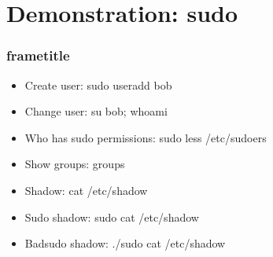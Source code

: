 \section{Demonstration: sudo}

\begin{frame}
  \frametitle{frametitle}
%
\begin{itemize}
  \item Create user:              sudo useradd bob
  \item Change user:              su bob; whoami
  \item Who has sudo permissions: sudo less /etc/sudoers
  \item Show groups:              groups
  \item Shadow:                   cat /etc/shadow
  \item Sudo shadow:              sudo cat /etc/shadow
  \item Badsudo shadow:           ./sudo cat /etc/shadow
\end{itemize}
%
\end{frame}
